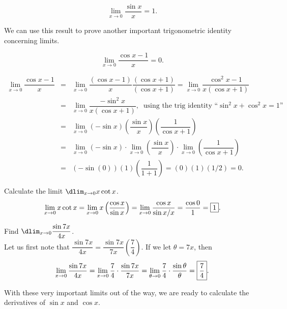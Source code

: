 \documentclass{book}
\begin{document}
\begin{Prop} \[\lim_{x\to 0} \dfrac{\sin x}{x} = 1.\]\end{Prop}\vs

We can use this result to prove another important trigonometric identity concerning limits.

\begin{Prop} \[\lim_{x\to 0} \dfrac{\cos x -1}{x} = 0.\] \end{Prop}
\begin{pf}\mbox{}\vspace{-30pt}

\begin{eqnarray*}
\lim_{x\to 0} \dfrac{\cos x - 1}{x} &=& \lim_{x\to 0} \dfrac{(\cos x - 1)}{x}\dfrac{(\cos x +1)}{(\cos x +1)} = \lim_{x\to 0} \dfrac{\cos^2 x - 1}{x(\cos x + 1)}\\
&=& \lim_{x\to 0} \dfrac{-\sin^2 x}{x(\cos x + 1)},\;\; \mbox{using the trig identity ``$\sin^2 x + \cos^2 x = 1$''}\\
&=& \lim_{x\to 0}(-\sin x)\left(\dfrac{\sin x}{x}\right)\left(\dfrac{1}{\cos x + 1}\right)\\
&=& \lim_{x\to 0}(-\sin x)\cdot\lim_{x\to 0}\left(\dfrac{\sin x}{x}\right)\cdot\lim_{x\to 0}\left(\dfrac{1}{\cos x + 1}\right)\\
&=& (-\sin (0))(1)\left(\dfrac{1}{1+1}\right) = (0)(1)(1/2) = 0. 
\end{eqnarray*}
\end{pf}\vs


\begin{Exam} Calculate the limit $\dlim_{x\to 0} x\cot x$.\\

\[\lim_{x\to 0} x\cot x = \lim_{x\to 0} x\left(\dfrac{\cos x}{\sin x}\right)  = \lim_{x\to 0} \dfrac{\cos x}{\sin x/x} = \dfrac{\cos 0}{1} = \fbox{$1$}. \]
\end{Exam}\vs

\begin{Exam} Find $\dlim_{x\to 0} \dfrac{\sin 7x }{4x}$. \\

Let us first note that $\dfrac{\sin 7x }{4x} = \dfrac{\sin 7x}{7x}\left(\dfrac{7}{4}\right)$. If we let $\theta = 7x$, then 
\[\lim_{x\to 0} \dfrac{\sin 7x }{4x} = \lim_{x\to 0} \dfrac{7}{4}\cdot \dfrac{\sin 7x}{7x} = \lim_{\theta\to 0} \dfrac{7}{4}\cdot \dfrac{\sin \theta }{\theta} = \fbox{$\dfrac{7}{4}$}. \]
\end{Exam}\vs

With these very important limits out of the way, we are ready to calculate the derivatives of $\sin x$ and $\cos x$.
\end{document}
